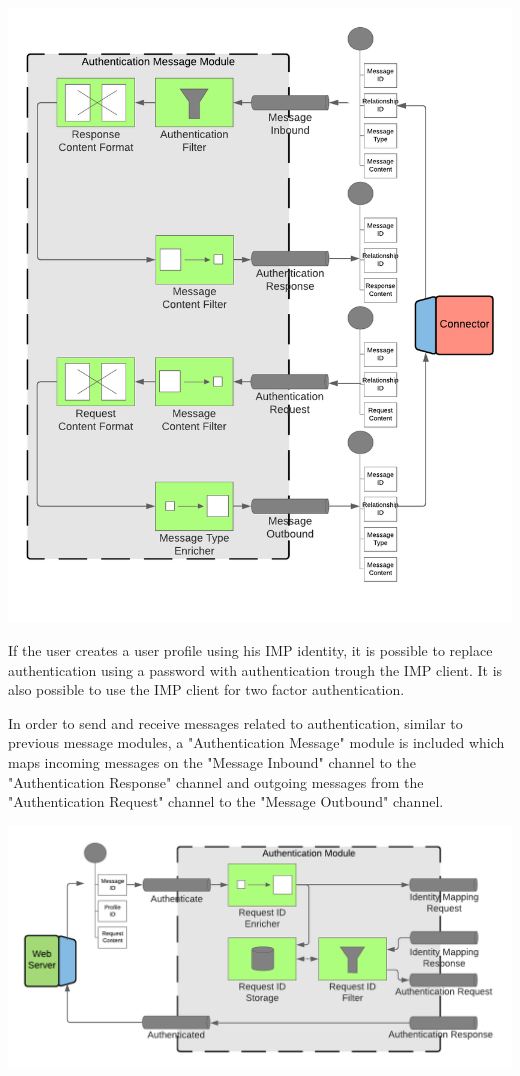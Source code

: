 \begin{center}
    \includegraphics[scale=0.6]{Diagrams/Integration Architecture 1/Technological Integration/14. Authenticatin Message Module.pdf}
\end{center}

If the user creates a user profile using his IMP identity, it is possible to replace authentication using a password with authentication trough the IMP client. It is also possible to use the IMP client for two factor authentication.

In order to send and receive messages related to authentication, similar to previous message modules, a "Authentication Message" module is included which maps incoming messages on the "Message Inbound" channel to the "Authentication Response" channel and outgoing messages from the "Authentication Request" channel to the "Message Outbound" channel.

\begin{center}
    \includegraphics[scale=0.6]{Diagrams/Integration Architecture 1/Technological Integration/15. Authentication.pdf}
\end{center}

